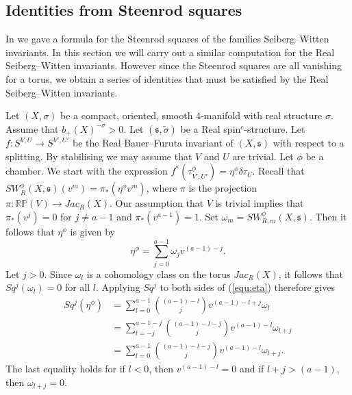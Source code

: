 \documentclass{amsart}
\theoremstyle{definition}
\theoremstyle{remark}
\numberwithin{equation}{section}
\begin{document}
\subsection{Identities from Steenrod squares}\label{sec:ident}

In \cite{bk} we gave a formula for the Steenrod squares of the families Seiberg--Witten invariants. In this section we will carry out a similar computation for the Real Seiberg--Witten invariants. However since the Steenrod squares are all vanishing for a torus, we obtain a series of identities that must be satisfied by the Real Seiberg--Witten invariants.

Let $(X,\sigma)$ be a compact, oriented, smooth $4$-manifold with real structure $\sigma$. Assume that $b_+(X)^{-\sigma} > 0$. Let $(\mathfrak{s} , \widetilde{\sigma})$ be a Real spin$^c$-structure. Let $f : S^{V,U} \to S^{V',U'}$ be the Real Bauer--Furuta invariant of $(X , \mathfrak{s})$ with respect to a splitting. By stabilising we may assume that $V$ and $U$ are trivial. Let $\phi$ be a chamber. We start with the expression $f^*( \tau^\phi_{V',U'} ) = \eta^\phi \delta \tau_U$. Recall that $SW^\phi_R(X,\mathfrak{s})(v^m) = \pi_*( \eta^\phi v^m )$, where $\pi$ is the projection $\pi : \mathbb{RP}(V) \to Jac_R(X)$. Our assumption that $V$ is trivial implies that $\pi_*(v^j) = 0$ for $j \neq a-1$ and $\pi_*(v^{a-1}) = 1$. Set $\omega_m = SW^\phi_{R,m}(X,\mathfrak{s})$. Then it follows that $\eta^\phi$ is given by
\begin{equation}\label{equ:eta}
\eta^\phi = \sum_{j=0}^{a-1} \omega_j v^{(a-1)-j}.
\end{equation}
Let $j > 0$. Since $\omega_l$ is a cohomology class on the torus $Jac_R(X)$, it follows that $Sq^j(\omega_l) = 0$ for all $l$. Applying $Sq^j$ to both sides of (\ref{equ:eta}) therefore gives
\begin{align*}
Sq^j(\eta^\phi) &= \sum_{l=0}^{a-1} \binom{(a-1)-l}{j} v^{(a-1)-l+j} \omega_l \\
&= \sum_{l=-j}^{a-1-j} \binom{(a-1)-l-j}{j} v^{(a-1)-l} \omega_{l+j} \\
&= \sum_{l=0}^{a-1} \binom{(a-1)-l-j}{j} v^{(a-1)-l}\omega_{l+j}.
\end{align*}
The last equality holds for if $l < 0$, then $v^{(a-1)-l} = 0$ and if $l+j > (a-1)$, then $\omega_{l+j} = 0$.
\end{document}

